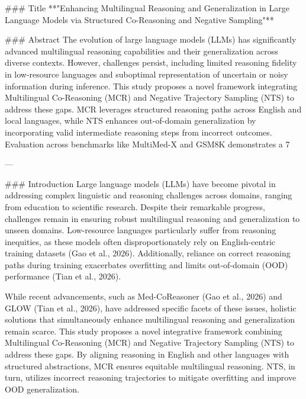 ### Title 
**"Enhancing Multilingual Reasoning and Generalization in Large Language Models via Structured Co-Reasoning and Negative Sampling"**

### Abstract
The evolution of large language models (LLMs) has significantly advanced multilingual reasoning capabilities and their generalization across diverse contexts. However, challenges persist, including limited reasoning fidelity in low-resource languages and suboptimal representation of uncertain or noisy information during inference. This study proposes a novel framework integrating Multilingual Co-Reasoning (MCR) and Negative Trajectory Sampling (NTS) to address these gaps. MCR leverages structured reasoning paths across English and local languages, while NTS enhances out-of-domain generalization by incorporating valid intermediate reasoning steps from incorrect outcomes. Evaluation across benchmarks like MultiMed-X and GSM8K demonstrates a 7%

---

### Introduction
Large language models (LLMs) have become pivotal in addressing complex linguistic and reasoning challenges across domains, ranging from education to scientific research. Despite their remarkable progress, challenges remain in ensuring robust multilingual reasoning and generalization to unseen domains. Low-resource languages particularly suffer from reasoning inequities, as these models often disproportionately rely on English-centric training datasets (Gao et al., 2026). Additionally, reliance on correct reasoning paths during training exacerbates overfitting and limits out-of-domain (OOD) performance (Tian et al., 2026).

While recent advancements, such as Med-CoReasoner (Gao et al., 2026) and GLOW (Tian et al., 2026), have addressed specific facets of these issues, holistic solutions that simultaneously enhance multilingual reasoning and generalization remain scarce. This study proposes a novel integrative framework combining Multilingual Co-Reasoning (MCR) and Negative Trajectory Sampling (NTS) to address these gaps. By aligning reasoning in English and other languages with structured abstractions, MCR ensures equitable multilingual reasoning. NTS, in turn, utilizes incorrect reasoning trajectories to mitigate overfitting and improve OOD generalization.

